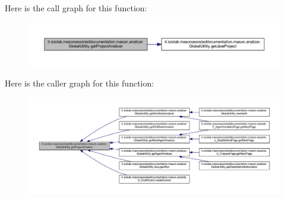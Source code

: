 Here is the call graph for this function\-:
\nopagebreak
\begin{figure}[H]
\begin{center}
\leavevmode
\includegraphics[width=350pt]{classit_1_1isislab_1_1masonassisteddocumentation_1_1mason_1_1analizer_1_1_global_utility_a78cbdc6022c558d1375a01095ad95659_cgraph}
\end{center}
\end{figure}




Here is the caller graph for this function\-:
\nopagebreak
\begin{figure}[H]
\begin{center}
\leavevmode
\includegraphics[width=350pt]{classit_1_1isislab_1_1masonassisteddocumentation_1_1mason_1_1analizer_1_1_global_utility_a78cbdc6022c558d1375a01095ad95659_icgraph}
\end{center}
\end{figure}


